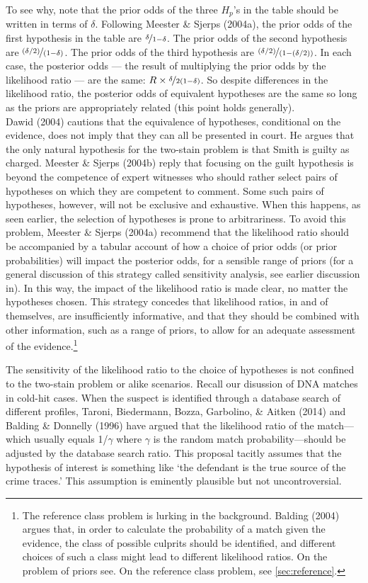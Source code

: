\documentclass[10pt,dvipsnames,enabledeprecatedfontcommands]{scrartcl}
\begin{document}
To see why, note that the prior odds of the three \(H_p\)'s in the table
should be written in terms of \(\delta\). Following Meester \& Sjerps
(2004a), the prior odds of the first hypothesis in the table are
\(\nicefrac{\delta}{1-\delta}\). The prior odds of the second hypothesis
are \(\nicefrac{(\delta/2)}{(1-\delta)}\). The prior odds of the third
hypothesis are \(\nicefrac{(\delta/2)}{(1-(\delta/2))}\). In each case,
the posterior odds --- the result of multiplying the prior odds by the
likelihood ratio --- are the same:
\(R\times \nicefrac{\delta}{2(1-\delta)}\). So despite differences in
the likelihood ratio, the posterior odds of equivalent hypotheses are
the same so long as the priors are appropriately related (this point
holds generally).\\
Dawid (2004) cautions that the equivalence of hypotheses, conditional on
the evidence, does not imply that they can all be presented in court. He
argues that the only natural hypothesis for the two-stain problem is
that Smith is guilty as charged. Meester \& Sjerps (2004b) reply that
focusing on the guilt hypothesis is beyond the competence of expert
witnesses who should rather select pairs of hypotheses on which they are
competent to comment. Some such pairs of hypotheses, however, will not
be exclusive and exhaustive. When this happens, as seen earlier, the
selection of hypotheses is prone to arbitrariness. To avoid this
problem, Meester \& Sjerps (2004a) recommend that the likelihood ratio
should be accompanied by a tabular account of how a choice of prior odds
(or prior probabilities) will impact the posterior odds, for a sensible
range of priors (for a general discussion of this strategy called
sensitivity analysis, see earlier discussion in). In this
way, the impact of the likelihood ratio is made clear, no matter the
hypotheses chosen. This strategy concedes that likelihood ratios, in and
of themselves, are insufficiently informative, and that they should be
combined with other information, such as a range of priors, to allow for
an adequate assessment of the evidence.\footnote{The
  reference class problem is lurking in the background. Balding (2004)
  argues that, in order to calculate the probability of a match given
  the evidence, the class of possible culprits should be identified, and
  different choices of such a class might lead to different likelihood
  ratios. On the problem of priors see. On the reference class problem,
  see \ref{sec:reference}.}

The sensitivity of the likelihood ratio to the choice of hypotheses is
not confined to the two-stain problem or alike scenarios. Recall our
disussion of DNA matches in cold-hit cases. When the suspect is
identified through a database search of different profiles, Taroni,
Biedermann, Bozza, Garbolino, \& Aitken (2014) and Balding \& Donnelly
(1996) have argued that the likelihood ratio of the match---which
usually equals 1/\(\gamma\) where \(\gamma\) is the random match
probability---should be adjusted by the database search ratio. This
proposal tacitly assumes that the hypothesis of interest is something
like `the defendant is the true source of the crime traces.' This
assumption is eminently plausible but not uncontroversial.
\end{document}
